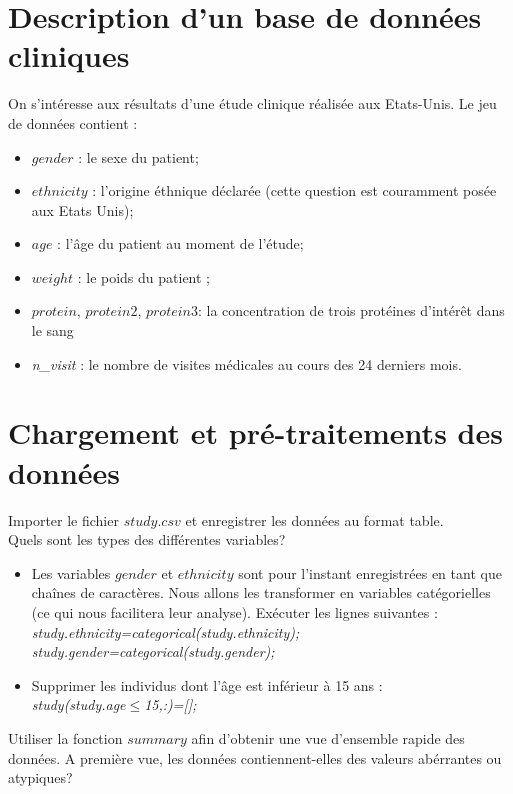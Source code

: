 \documentclass[11pt]{exam}
\begin{document}
 \section*{Description d'un base de donn\'ees cliniques}
On s'int\'eresse aux r\'esultats d'une \'etude clinique r\'ealis\'ee aux Etats-Unis. Le jeu de donn\'ees contient :
\begin{itemize}
\item $gender$ : le sexe du patient;
\item $ethnicity$ : l'origine \'ethnique d\'eclar\'ee (cette question est couramment pos\'ee  aux Etats Unis);
\item $age$ : l'\^age du patient au moment de l'\'etude;
\item $weight$ : le poids du patient ;
\item $protein$,   $protein2$,  $protein3$: la concentration de trois prot\'eines d'int\'er\^et dans le sang 
\item \textit{n\_visit} : le nombre de visites m\'edicales au cours des 24 derniers mois.
\end{itemize}

\section{Chargement et pr\'e-traitements des donn\'ees  } 
Importer le fichier $study.csv$ et enregistrer les donn\'ees au format table.\\
Quels sont les types des diff\'erentes variables? \\
\begin{itemize}
\item Les variables $gender$ et $ethnicity$ sont pour l'instant enregistr\'ees en tant que cha\^ines de caract\`eres. Nous allons les transformer en variables cat\'egorielles (ce qui nous facilitera leur analyse). Ex\'ecuter les lignes suivantes : \\
\indent \textit{study.ethnicity=categorical(study.ethnicity);}\\
\indent \textit{study.gender=categorical(study.gender);}
\item Supprimer les individus dont l'\^age est inf\'erieur \`a 15 ans :\\
\textit{study(study.age$\leq$15,:)=[];}\\
\end{itemize}



Utiliser la fonction $summary$ afin d'obtenir une vue d'ensemble rapide des donn\'ees. A premi\`ere vue, les donn\'ees contiennent-elles des valeurs ab\'errantes ou atypiques?
\end{document}
